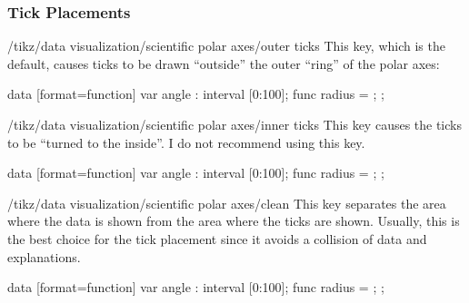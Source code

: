 \subsubsection{Tick Placements}

\begin{key}{/tikz/data visualization/scientific polar axes/outer ticks}
    This key, which is the default, causes ticks to be drawn ``outside'' the
    outer ``ring'' of the polar axes:
\begin{codeexample}[
    width=8.8cm,
    preamble={\usetikzlibrary{
    datavisualization.formats.functions,
    datavisualization.polar,
}},
]
\tikz \datavisualization [
  scientific polar axes={outer ticks, 0 to 180},
  visualize as smooth line]
data [format=function] {
  var  angle : interval [0:100];
  func radius = \value{angle};
};
\end{codeexample}
\end{key}

\begin{key}{/tikz/data visualization/scientific polar axes/inner ticks}
    This key causes the ticks to be ``turned to the inside''. I do not
    recommend using this key.
\begin{codeexample}[
    width=8.8cm,
    preamble={\usetikzlibrary{
    datavisualization.formats.functions,
    datavisualization.polar,
}},
]
\tikz \datavisualization [
  scientific polar axes={inner ticks, 0 to 180},
  visualize as smooth line]
data [format=function] {
  var  angle : interval [0:100];
  func radius = \value{angle};
};
\end{codeexample}
\end{key}

\begin{key}{/tikz/data visualization/scientific polar axes/clean}
    This key separates the area where the data is shown from the area where the
    ticks are shown. Usually, this is the best choice for the tick placement
    since it avoids a collision of data and explanations.
\begin{codeexample}[
    width=8.8cm,
    preamble={\usetikzlibrary{
    datavisualization.formats.functions,
    datavisualization.polar,
}},
]
\tikz \datavisualization [
  scientific polar axes={clean, 0 to 180},
  visualize as smooth line]
data [format=function] {
  var  angle : interval [0:100];
  func radius = \value{angle};
};
\end{codeexample}
\end{key}


